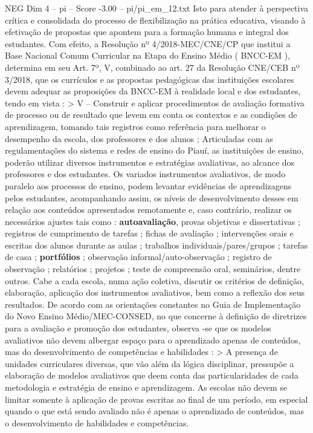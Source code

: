 \begin{textsample}{NEG Dim 4 – pi – Score -3.00 – pi/pi\_em\_12.txt}
Isto para atender à perspectiva crítica e consolidada do processo de flexibilização na prática educativa, visando à efetivação de propostas que apontem para a formação humana e integral dos estudantes.
Com efeito, a Resolução nº 4/2018-MEC/CNE/CP que institui a Base Nacional Comum Curricular na Etapa do Ensino Médio ( BNCC-EM ), determina em seu Art. 7º, V, combinado ao art. 27 da Resolução CNE/CEB nº 3/2018, que os currículos e as propostas pedagógicas das instituições escolares devem adequar as proposições da BNCC-EM à realidade local e dos estudantes, tendo em vista : > V – Construir e aplicar procedimentos de avaliação formativa de processo ou de resultado que levem em conta os contextos e as condições de aprendizagem, tomando tais registros como referência para melhorar o desempenho da escola, dos professores e dos alunos ; Articuladas com as regulamentações do sistema e redes de ensino do Piauí, as instituições de ensino, poderão utilizar diversos instrumentos e estratégias avaliativas, ao alcance dos professores e dos estudantes.
Os variados instrumentos avaliativos, de modo paralelo aos processos de ensino, podem levantar evidências de aprendizagens pelos estudantes, acompanhando assim, os níveis de desenvolvimento desses em relação aos conteúdos apresentados remotamente e, caso contrário, realizar os necessários ajustes tais como : \textbf{autoavaliação}, provas objetivas e dissertativas ; registros de cumprimento de tarefas ; fichas de avaliação ; intervenções orais e escritas dos alunos durante as aulas ; trabalhos individuais/pares/grupos ; tarefas de casa ; \textbf{portfólios} ; observação informal/auto-observação ; registro de observação ; relatórios ; projetos ; teste de compreensão oral, seminários, dentre outros.
Cabe a cada escola, numa ação coletiva, discutir os critérios de definição, elaboração, aplicação dos instrumentos avaliativos, bem como a reflexão dos seus resultados.
De acordo com as orientações constantes no Guia de Implementação do Novo Ensino Médio/MEC-CONSED, no que concerne à definição de diretrizes para a avaliação e promoção dos estudantes, observa -se que os modelos avaliativos não devem albergar espaço para o aprendizado apenas de conteúdos, mas do desenvolvimento de competências e habilidades : > A presença de unidades curriculares diversas, que vão além da lógica disciplinar, pressupõe a elaboração de modelos avaliativos que deem conta das particularidades de cada metodologia e estratégia de ensino e aprendizagem.
As escolas não devem se limitar somente à aplicação de provas escritas ao final de um período, em especial quando o que está sendo avaliado não é apenas o aprendizado de conteúdos, mas o desenvolvimento de habilidades e competências.

\end{textsample}
